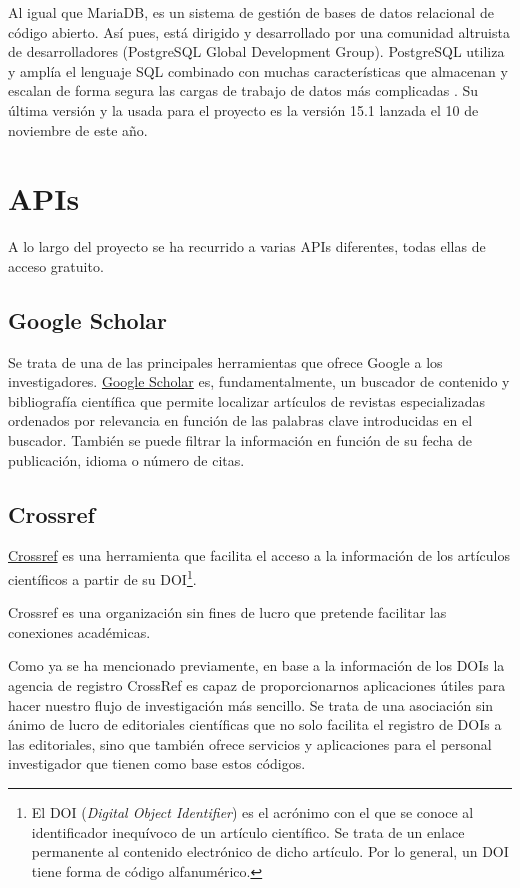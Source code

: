 Al igual que MariaDB, es un sistema de gestión de bases de datos relacional de código abierto. Así pues, está dirigido y desarrollado por una comunidad altruista de desarrolladores (PostgreSQL Global Development Group).
PostgreSQL utiliza y amplía el lenguaje SQL combinado con muchas características que almacenan y escalan de forma segura las cargas de trabajo de datos más complicadas \cite{Postgresql.org}. 
Su última versión y la usada para el proyecto es la versión 15.1 lanzada el 10 de noviembre de este año.



\section{APIs}
A lo largo del proyecto se ha recurrido a varias APIs diferentes, todas ellas de acceso gratuito.

\subsection{Google Scholar}
Se trata de una de las principales herramientas que ofrece Google a los investigadores. \href{https://scholar.google.com/}{Google Scholar} es, fundamentalmente, un buscador de contenido y bibliografía científica que permite localizar artículos de revistas especializadas ordenados por relevancia en función de las palabras clave introducidas en el buscador. También se puede  filtrar la información en función de su fecha de publicación, idioma o número de citas.


\subsection{Crossref}
\href{https://www.crossref.org/}{Crossref} es una herramienta que facilita el  acceso a la información de los artículos científicos a partir de su DOI\footnote{El DOI (\textit{Digital Object Identifier}) es el acrónimo con el que se conoce al identificador inequívoco de un artículo científico. Se trata de un enlace permanente al contenido electrónico de dicho artículo. Por lo general, un DOI tiene forma de código alfanumérico.}.

Crossref es una organización sin fines de lucro que pretende facilitar las conexiones académicas.

Como ya se ha mencionado previamente, en base a la información de los DOIs la agencia de registro CrossRef es capaz de proporcionarnos aplicaciones útiles para hacer nuestro flujo de investigación más sencillo.
Se trata de una asociación sin ánimo de lucro de editoriales científicas que no solo facilita el registro de DOIs a las editoriales, sino que también ofrece servicios y aplicaciones para el personal investigador que tienen como base estos códigos.

